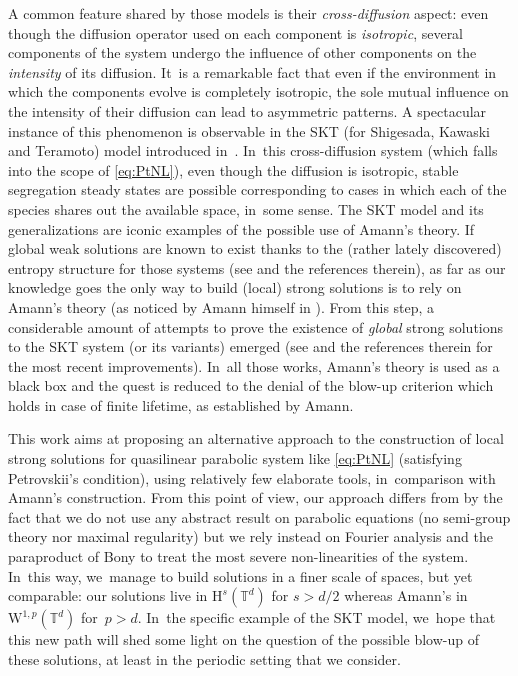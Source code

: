 \documentclass[JEP,XML,SOM,Unicode,published]{cedram}
\theoremstyle{definition}
\newcommand\T{\mathbb{T}}
\renewcommand\H{\mathrm{H}}
\newcommand\W{\mathrm{W}}
\begin{document}
A common feature shared by those models is their \emph{cross-diffusion} aspect: even though the diffusion operator used on each component is \emph{isotropic}, several components of the system undergo the influence of other components on the \emph{intensity} of its diffusion. It~is a remarkable fact that even if the environment in which the components evolve is completely isotropic, the sole mutual influence on the intensity of their diffusion can lead to asymmetric patterns. A spectacular instance of this phenomenon is observable in the SKT (for Shigesada, Kawaski and Teramoto) model introduced in~\cite{skt}. In~this cross-diffusion system (which falls into the scope of \eqref{eq:PtNL}), even though the diffusion is isotropic, stable segregation steady states are possible corresponding to cases in which each of the species shares out the available space, in~some sense. The SKT model and its generalizations are iconic examples of the possible use of Amann's theory. If global weak solutions are known to exist thanks to the (rather lately discovered) entropy structure for those systems (see \cite{chen_jun,dlmt} and the references therein), as far as our knowledge goes the only way to build (local) strong solutions is to rely on Amann's theory (as noticed by Amann himself in \cite{amann}). From this step, a considerable amount of attempts to prove the existence of \emph{global} strong solutions to the SKT system (or its variants) emerged (see \cite{HNP,GMT} and the references therein for the most recent improvements). In~all those works, Amann's theory is used as a black box and the quest is reduced to the denial of the blow-up criterion which holds in case of finite lifetime, as established by Amann.

This work aims at proposing an alternative approach to the construction of local strong solutions for quasilinear parabolic system like \eqref{eq:PtNL} (satisfying Petrovskii's condition), using relatively few elaborate tools, in~comparison with Amann's construction. From this point of view, our approach differs from \cite{amann} by the fact that we do not use any abstract result on parabolic equations (no semi-group theory nor maximal regularity) but we rely instead on Fourier analysis and the paraproduct of Bony \cite{bony} to treat the most severe non-linearities of the system. In~this way, we~manage to build solutions in a finer scale of spaces, but yet comparable: our solutions live in $\H^s(\T^d)$ for $s>d/2$ whereas Amann's in $\W^{1,p}(\T^d)$ for~$p>d$. In~the specific example of the SKT model, we~hope that this new path will shed some light on the question of the possible blow-up of these solutions, at least in the periodic setting that we consider.
\end{document}
